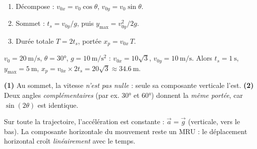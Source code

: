 \documentclass[11pt,a4paper]{article}
\newcommand{\vv}[1]{\vec{#1}}\newcommand{\ds}{\displaystyle}
\begin{document}
\begin{methode}
\begin{enumerate}[label=\arabic*.,leftmargin=1.6em,topsep=1pt,itemsep=0pt]
  \item Décompose : $v_{0x}=v_0\cos\theta$, $v_{0y}=v_0\sin\theta$.
  \item Sommet : $t_s=v_{0y}/g$, puis $y_{\max}=v_{0y}^2/2g$.
  \item Durée totale $T=2t_s$, portée $x_p=v_{0x}\,T$.
\end{enumerate}
\end{methode}

\begin{exemplebox}
$v_0=\qty{20}{\metre\per\second}$, $\theta=\ang{30}$, $g=\qty{10}{\metre\per\second\squared}$ :
$v_{0x}=10\sqrt3$, $v_{0y}=\qty{10}{\metre\per\second}$. Alors $t_s=\qty{1}{\second}$,
$y_{\max}=\qty{5}{\metre}$, $x_p=v_{0x}\times2t_s=20\sqrt3\approx\qty{34,6}{\metre}$.
\end{exemplebox}

\begin{piege}
\textbf{(1)} Au sommet, la vitesse \emph{n'est pas nulle} : seule sa composante verticale l'est.\quad
\textbf{(2)} Deux angles \emph{complémentaires} (par ex. \ang{30} et \ang{60}) donnent la \emph{même portée},
car $\sin(2\theta)$ est identique.
\end{piege}

\begin{remarque}
Sur toute la trajectoire, l'accélération est constante : $\vv{a}=\vv{g}$ (verticale, vers le bas).
La composante horizontale du mouvement reste un MRU : le déplacement horizontal croît \emph{linéairement} avec le temps.
\end{remarque}
\end{document}
